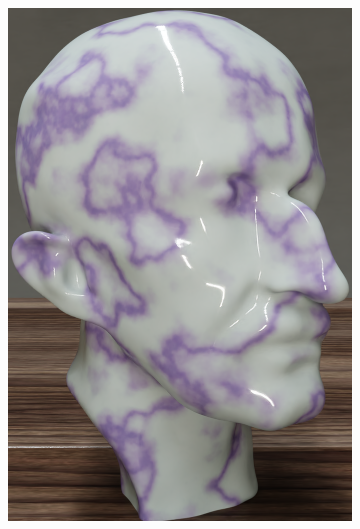\begin{figure}[h]
\begin{subfigure}[b]{0.32\textwidth}
       \includegraphics[width=\textwidth]{img/ch7/max_plank_mrnet_512_mc400.0099.png}
       \caption{}
   \end{subfigure}
   \begin{subfigure}[b]{0.32\textwidth}
       \centering

\end{subfigure}
\end{figure}
